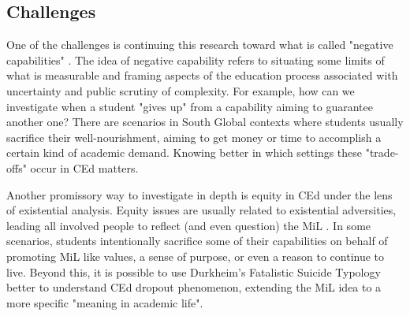 
                

        

        

\subsection{Challenges}

 One of the challenges is continuing this research toward what is called "negative capabilities" \cite{unterhalter:2020}. The idea of negative capability refers to situating some limits of what is measurable and framing aspects of the education process associated with uncertainty and public scrutiny of complexity. For example, how can we investigate when a student "gives up" from a capability aiming to guarantee another one? There are scenarios in South Global contexts where students usually sacrifice their well-nourishment, aiming to get money or time to accomplish a certain kind of academic demand. Knowing better in which settings these "trade-offs" occur in \gls{CEd} matters.

 Another promissory way to investigate in depth is equity in \gls{CEd} under the lens of existential analysis. Equity issues are usually related to existential adversities, leading all involved people to reflect (and even question) the \gls{MiL} \cite{manco:2021}. In some scenarios, students intentionally sacrifice some of their capabilities on behalf of promoting \gls{MiL} like values, a sense of purpose, or even a reason to continue to live. Beyond this, it is possible to use Durkheim's Fatalistic Suicide Typology \cite{godor:2017} better to understand \gls{CEd} dropout phenomenon, extending the \gls{MiL} idea to a more specific "meaning in academic life".

